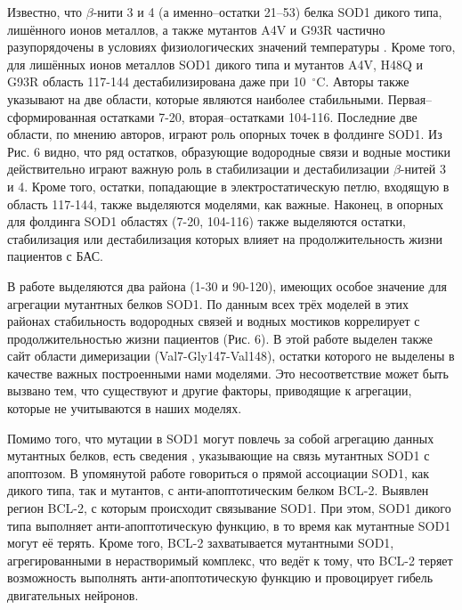 Известно, что $\beta$-нити 3 и 4 (а именно--остатки 21–53) белка SOD1 дикого типа, лишённого ионов металлов, а также мутантов A4V и G93R частично разупорядочены в условиях физиологических значений температуры \cite{Durazo2009}. Кроме того, для лишённых ионов металлов SOD1 дикого типа и мутантов A4V, H48Q и G93R область 117-144 дестабилизирована даже при 10~${}^\circ$C. Авторы также указывают на две области, которые являются наиболее стабильными. Первая--сформированная остатками 7-20, вторая--остатками 104-116. Последние две области, по мнению авторов, играют роль опорных точек в фолдинге SOD1. Из Рис. 6 видно, что ряд остатков, образующие водородные связи и водные мостики действительно играют важную роль в стабилизации и дестабилизации $\beta$-нитей 3 и 4. Кроме того, остатки, попадающие в электростатическую петлю, входящую в область 117-144, также выделяются моделями, как важные. Наконец, в опорных для фолдинга SOD1 областях (7-20, 104-116) также выделяются остатки, стабилизация или дестабилизация которых влияет на продолжительность жизни пациентов с БАС.

В работе \cite{Wright2013} выделяются два района (1-30 и 90-120), имеющих особое значение для агрегации мутантных белков SOD1. По данным всех трёх моделей в этих районах стабильность водородных связей и водных мостиков коррелирует с продолжительностью жизни пациентов (Рис. 6). В этой работе \cite{Wright2013} выделен также сайт области димеризации (Val7-Gly147-Val148), остатки которого не выделены в качестве важных построенными нами моделями. Это несоответствие может быть вызвано тем, что существуют и другие факторы, приводящие к агрегации, которые не учитываются в наших моделях.

Помимо того, что мутации в SOD1 могут повлечь за собой агрегацию данных мутантных  белков, есть сведения \cite{Pasinelli2004}, указывающие на связь мутантных SOD1 с апоптозом. В упомянутой работе говориться о прямой ассоциации SOD1, как дикого типа, так и мутантов, с анти-апоптотическим белком BCL-2. Выявлен регион BCL-2, с которым происходит связывание SOD1. При этом, SOD1 дикого типа выполняет анти-апоптотическую функцию, в то время как мутантные SOD1 могут её терять. Кроме того, BCL-2 захватывается мутантными SOD1, агрегированными в нерастворимый комплекс, что ведёт к тому, что BCL-2 теряет возможность выполнять анти-апоптотическую функцию и провоцирует гибель двигательных нейронов.